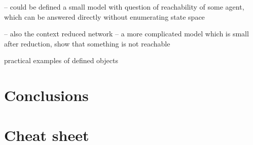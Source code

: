 \documentclass[12pt]{fithesis2}
\begin{document}
-- could be defined a small model with question of reachability of some agent, which can be answered directly without enumerating state space

-- also the context reduced network -- a more complicated model which is small after reduction, show that something is not reachable

practical examples of defined objects

\chapter{Conclusions}




\appendix

\chapter{Cheat sheet}
\end{document}
